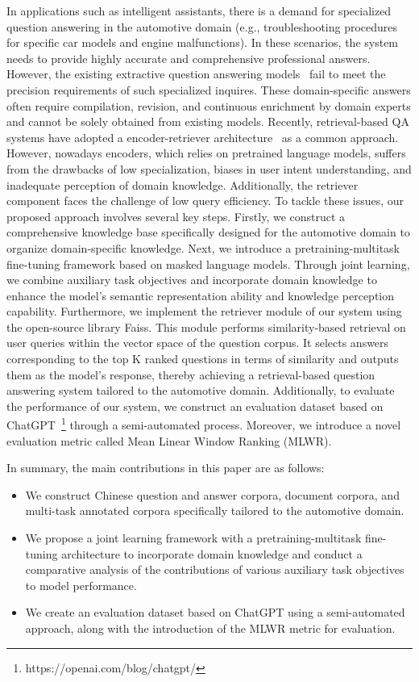 \documentclass[mathematics,article,submit,moreauthors]{Definitions/mdpi}
\newcommand{\1}[1]{\mathds{1}\left[#1\right]}
\begin{document}
In applications such as intelligent assistants, there is a demand for specialized question answering in the automotive domain (e.g., troubleshooting procedures for specific car models and engine malfunctions). In these scenarios, the system needs to provide highly accurate and comprehensive professional answers. However, the existing extractive question answering models~\cite{squad,squad2.0,multispanqa} fail to meet the precision requirements of such specialized inquires. These domain-specific answers often require compilation, revision, and continuous enrichment by domain experts and cannot be solely obtained from existing models. Recently, retrieval-based QA systems have adopted a encoder-retriever architecture~\cite{bertserini,qa-survey} as a common approach. However, nowadays encoders, which relies on pretrained language models, suffers from the drawbacks of low specialization, biases in user intent understanding, and inadequate perception of domain knowledge. Additionally, the retriever component faces the challenge of low query efficiency. 
To tackle these issues, our proposed approach involves several key steps. Firstly, we construct a  comprehensive knowledge base specifically designed for the automotive domain to organize domain-specific knowledge. Next, we introduce a pretraining-multitask fine-tuning framework based on  masked language models. Through joint learning, we combine auxiliary task objectives and incorporate domain knowledge to enhance the model's semantic representation ability and knowledge perception capability. 
Furthermore, we implement the retriever module of our system using the open-source library Faiss. This module performs similarity-based retrieval on user queries within the vector space of the question corpus. It selects answers corresponding to the top K ranked questions in terms of similarity and outputs them as the model's response, thereby achieving a retrieval-based question answering system tailored to the automotive domain.
Additionally, to evaluate the performance of our system, we construct an evaluation dataset based on ChatGPT~\footnote{https://openai.com/blog/chatgpt/} through a semi-automated process. Moreover, we introduce a novel evaluation metric called Mean Linear Window Ranking (MLWR). 


In summary, the main contributions in this paper are as follows:
\begin{itemize}
	\item We construct Chinese question and answer corpora, document corpora, and multi-task annotated corpora specifically tailored to the automotive domain.
	\item We propose a joint learning framework with a pretraining-multitask fine-tuning architecture to incorporate domain knowledge and conduct a comparative analysis of the contributions of various auxiliary task objectives to model performance.
	\item We create an evaluation dataset based on ChatGPT using a semi-automated approach, along with the introduction of the MLWR metric for evaluation.
\end{itemize}
\end{document}
